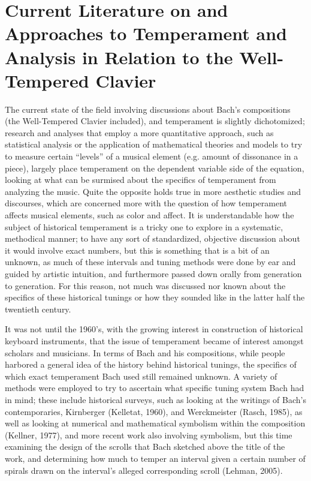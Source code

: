     \section{Current Literature on and Approaches to Temperament and
Analysis in Relation to the Well-Tempered
Clavier}\label{current-literature-on-and-approaches-to-temperament-and-analysis-in-relation-to-the-well-tempered-clavier}

The current state of the field involving discussions about Bach's
compositions (the Well-Tempered Clavier included), and temperament is
slightly dichotomized; research and analyses that employ a more
quantitative approach, such as statistical analysis or the application
of mathematical theories and models to try to measure certain ``levels''
of a musical element (e.g. amount of dissonance in a piece), largely
place temperament on the dependent variable side of the equation,
looking at what can be surmised about the specifics of temperament from
analyzing the music. Quite the opposite holds true in more aesthetic
studies and discourses, which are concerned more with the question of
how temperament affects musical elements, such as color and affect. It
is understandable how the subject of historical temperament is a tricky
one to explore in a systematic, methodical manner; to have any sort of
standardized, objective discussion about it would involve exact numbers,
but this is something that is a bit of an unknown, as much of these
intervals and tuning methods were done by ear and guided by artistic
intuition, and furthermore passed down orally from generation to
generation. For this reason, not much was discussed nor known about the
specifics of these historical tunings or how they sounded like in the
latter half the twentieth century.

It was not until the 1960's, with the growing interest in construction
of historical keyboard instruments, that the issue of temperament became
of interest amongst scholars and musicians. In terms of Bach and his
compositions, while people harbored a general idea of the history behind
historical tunings, the specifics of which exact temperament Bach used
still remained unknown. A variety of methods were employed to try to
ascertain what specific tuning system Bach had in mind; these include
historical surveys, such as looking at the writings of Bach's
contemporaries, Kirnberger (Kelletat, 1960), and Werckmeister (Rasch,
1985), as well as looking at numerical and mathematical symbolism within
the composition (Kellner, 1977), and more recent work also involving
symbolism, but this time examining the design of the scrolls that Bach
sketched above the title of the work, and determining how much to temper
an interval given a certain number of spirals drawn on the interval's
alleged corresponding scroll (Lehman, 2005).

